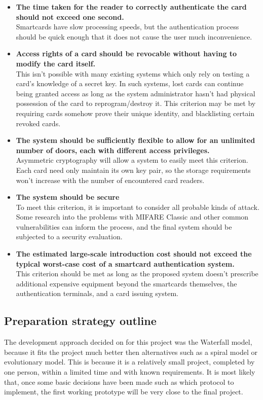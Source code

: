 \documentclass[12pt,a4paper]{article}
\begin{document}
\begin{itemize}
	\item \textbf{The time taken for the reader to correctly authenticate the card should not exceed one second.}\\
	Smartcards have slow processing speeds, but the authentication process should be quick enough that it does not cause the user much inconvenience.
	
	\item \textbf{Access rights of a card should be revocable without having to modify the card itself.}\\
	This isn't possible with many existing systems which only rely on testing a card's knowledge of a secret key. In such systems, lost cards can continue being granted access as long as the system administrator hasn't had physical possession of the card to reprogram/destroy it. This criterion may be met by requiring cards somehow prove their unique identity, and blacklisting certain revoked cards.
	
	\item \textbf{The system should be sufficiently flexible to allow for an unlimited number of doors, each with different access privileges.}\\
	Asymmetric cryptography will allow a system to easily meet this criterion. Each card need only maintain its own key pair, so the storage requirements won't increase with the number of encountered card readers.
	
	\item \textbf{The system should be secure}\\
	To meet this criterion, it is important to consider all probable kinds of attack. Some research into the problems with MIFARE Classic and other common vulnerabilities can inform the process, and the final system should be subjected to a security evaluation.
	
	\item \textbf{The estimated large-scale introduction cost should not exceed the typical worst-case cost of a smartcard authentication system.}\\
	This criterion should be met as long as the proposed system doesn't prescribe additional expensive equipment beyond the smartcards themselves, the authentication terminals, and a card issuing system.
	
	
\end{itemize}



\subsection{Preparation strategy outline}
The development approach decided on for this project was the Waterfall model, because it fits the project much better then alternatives such as a spiral model or evolutionary model. This is because it is a relatively small project, completed by one person, within a limited time and with known requirements. It is most likely that, once some basic decisions have been made such as which protocol to implement, the first working prototype will be very close to the final project.
\end{document}
